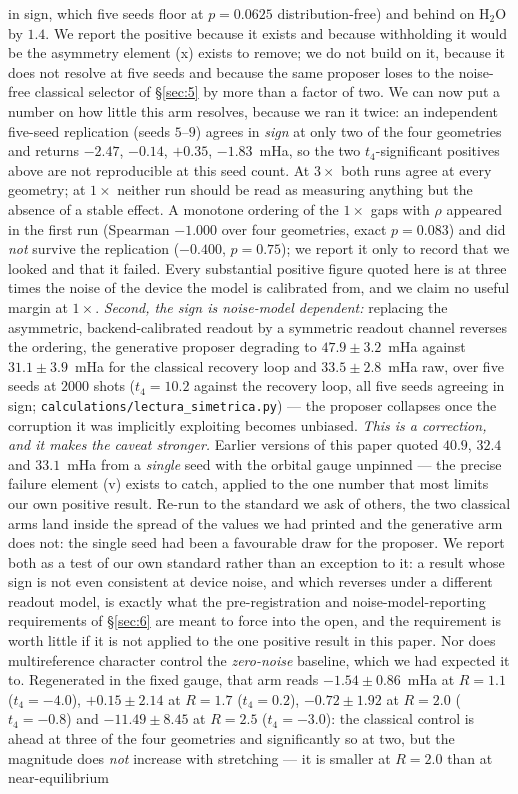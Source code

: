 \documentclass[onecolumn,a4paper]{quantumarticle}
\begin{document}
in sign, which five seeds floor at $p{=}0.0625$ distribution-free) and behind on H$_2$O by $1.4$. We report the positive because it exists and because withholding it would be the asymmetry element (x) exists to remove; we do not build on it, because it does not resolve at five seeds and because the same proposer loses to the noise-free classical selector of \S\ref{sec:5} by more than a factor of two. We can now put a number on how little this arm resolves, because we ran it twice: an independent five-seed replication (seeds $5$--$9$) agrees in \emph{sign} at only two of the four geometries and returns $-2.47$, $-0.14$, $+0.35$, $-1.83$~mHa, so the two $t_4$-significant positives above are not reproducible at this seed count. At $3\times$ both runs agree at every geometry; at $1\times$ neither run should be read as measuring anything but the absence of a stable effect. A monotone ordering of the $1\times$ gaps with $\rho$ appeared in the first run (Spearman $-1.000$ over four geometries, exact $p{=}0.083$) and did \emph{not} survive the replication ($-0.400$, $p{=}0.75$); we report it only to record that we looked and that it failed. Every substantial positive figure quoted here is at three times the noise of the device the model is calibrated from, and we claim no useful margin at $1\times$. \emph{Second, the sign is noise-model dependent:} replacing the asymmetric, backend-calibrated readout by a symmetric readout channel reverses the ordering, the generative proposer degrading to $47.9\pm3.2$~mHa against $31.1\pm3.9$~mHa for the classical recovery loop and $33.5\pm2.8$~mHa raw, over five seeds at $2000$ shots ($t_4{=}10.2$ against the recovery loop, all five seeds agreeing in sign; \texttt{calculations/lectura\_simetrica.py}) --- the proposer collapses once the corruption it was implicitly exploiting becomes unbiased. \emph{This is a correction, and it makes the caveat stronger.} Earlier versions of this paper quoted $40.9$, $32.4$ and $33.1$~mHa from a \emph{single} seed with the orbital gauge unpinned --- the precise failure element (v) exists to catch, applied to the one number that most limits our own positive result. Re-run to the standard we ask of others, the two classical arms land inside the spread of the values we had printed and the generative arm does not: the single seed had been a favourable draw for the proposer. We report both as a test of our own standard rather than an exception to it: a result whose sign is not even consistent at device noise, and which reverses under a different readout model, is exactly what the pre-registration and noise-model-reporting requirements of \S\ref{sec:6} are meant to force into the open, and the requirement is worth little if it is not applied to the one positive result in this paper. Nor does multireference character control the \emph{zero-noise} baseline, which we had expected it to. Regenerated in the fixed gauge, that arm reads $-1.54\pm0.86$~mHa at $R{=}1.1$ ($t_4{=}-4.0$), $+0.15\pm2.14$ at $R{=}1.7$ ($t_4{=}0.2$), $-0.72\pm1.92$ at $R{=}2.0$ ($t_4{=}-0.8$) and $-11.49\pm8.45$ at $R{=}2.5$ ($t_4{=}-3.0$): the classical control is ahead at three of the four geometries and significantly so at two, but the magnitude does \emph{not} increase with stretching --- it is smaller at $R{=}2.0$ than at near-equilibrium 
\end{document}
